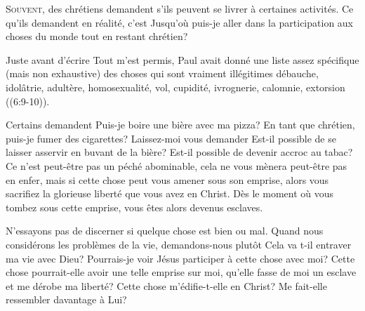 \dvrule







\lettrine{S}{ouvent}, 
 des chrétiens demandent s'ils peuvent se livrer
 à certaines activités. Ce qu'ils demandent en réalité,
 c'est\frcolon{}
 \Og Jusqu'où puis-je aller dans la participation
 aux choses du monde tout en restant chrétien? \Fg{}

Juste avant d'écrire \Og Tout m'est permis, \Fg{}
 Paul avait donné une liste assez spécifique
 (mais non exhaustive) des choses qui sont vraiment illégitimes\frcolon{}
 débauche, idolâtrie, adultère, homosexualité,
 vol, cupidité, ivrognerie, calomnie, extorsion
 ((6:9-10)).


Certains demandent\frcolon{}
 \Og Puis-je boire une bière avec ma pizza?
 En tant que chrétien, puis-je fumer des cigarettes? \Fg{}
 Laissez-moi vous demander\frcolon{} 
 \Og Est-il possible de se laisser asservir en buvant de la bière?
 Est-il possible de devenir accroc au tabac? \Fg{}
 Ce n'est peut-être pas un péché abominable,
 cela ne vous mènera peut-être pas en enfer,
 mais si cette chose peut vous amener sous son emprise,
 alors vous sacrifiez la glorieuse liberté que vous avez en Christ.
 Dès le moment où vous tombez sous cette emprise,
 vous êtes alors devenus esclaves.

N'essayons pas de discerner si quelque chose est bien ou mal.
 Quand nous considérons les problèmes de la vie,
 demandons-nous plutôt\frcolon{} \Og {}
 Cela va t-il entraver ma vie avec Dieu?
 Pourrais-je voir Jésus participer à cette chose avec moi?
 Cette chose pourrait-elle avoir une telle emprise sur moi,
 qu'elle fasse de moi un esclave et me dérobe ma liberté?
 Cette chose m'édifie-t-elle en Christ?
 Me fait-elle ressembler davantage à Lui? \Fg{}

